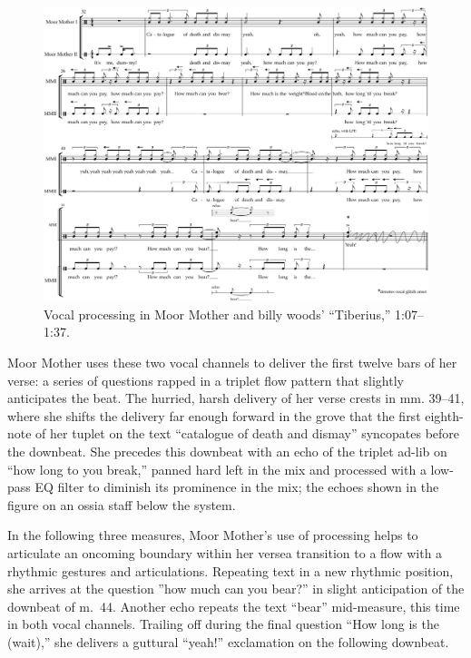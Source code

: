 \begin{figure}[!p]
    \centering
    \includegraphics[width=\textwidth]{images/figures/chp 03/107136tiberiusprocessing.pdf}
    \caption{Vocal processing in Moor Mother and billy woods' ``Tiberius,'' 1:07--1:37.}
    \label{fig:moormotherprocess}
\end{figure}

Moor Mother uses these two vocal channels to deliver the first twelve bars of her verse: a series of questions
rapped in a triplet flow pattern that slightly anticipates the beat. The hurried, harsh delivery of her verse
crests in mm. 39--41, where she shifts the delivery far enough forward in the grove that the first eighth-note
of her tuplet on the text ``catalogue of death and dismay'' syncopates before the downbeat. She precedes this
downbeat with an echo of the triplet ad-lib on ``how long to you break,'' panned hard left in the mix and
processed with a low-pass EQ filter to diminish its prominence in the mix; the echoes shown in the figure 
on an ossia staff below the system.

In the following three measures, Moor Mother's use of processing helps to articulate an oncoming boundary within
her verse\textemdash a transition to a flow with a rhythmic gestures and articulations. Repeating text in a new
rhythmic position, she arrives at the question ''how much can you bear?'' in slight anticipation of the downbeat
of m.~44. Another echo repeats the text ``bear'' mid-measure, this time in both vocal channels. Trailing off during
the final question ``How long is the (wait),'' she delivers a guttural ``yeah!'' exclamation on the following downbeat.

